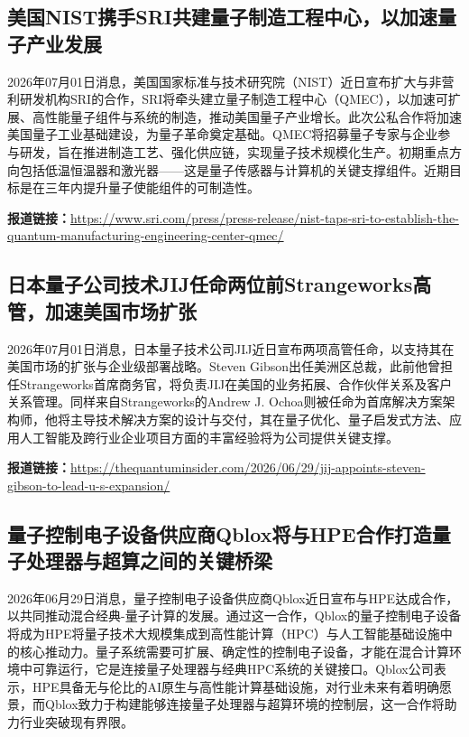\documentclass[12pt,a4paper]{ctexart}
\begin{document}
\subsection{ 美国NIST携手SRI共建量子制造工程中心，以加速量子产业发展 }

2026年07月01日消息，美国国家标准与技术研究院（NIST）近日宣布扩大与非营利研发机构SRI的合作，SRI将牵头建立量子制造工程中心（QMEC），以加速可扩展、高性能量子组件与系统的制造，推动美国量子产业增长。此次公私合作将加速美国量子工业基础建设，为量子革命奠定基础。QMEC将招募量子专家与企业参与研发，旨在推进制造工艺、强化供应链，实现量子技术规模化生产。初期重点方向包括低温恒温器和激光器——这是量子传感器与计算机的关键支撑组件。近期目标是在三年内提升量子使能组件的可制造性。

\noindent\textbf{报道链接：}\url{https://www.sri.com/press/press-release/nist-taps-sri-to-establish-the-quantum-manufacturing-engineering-center-qmec/}

\subsection{ 日本量子公司技术JIJ任命两位前Strangeworks高管，加速美国市场扩张 }

2026年07月01日消息，日本量子技术公司JIJ近日宣布两项高管任命，以支持其在美国市场的扩张与企业级部署战略。Steven Gibson出任美洲区总裁，此前他曾担任Strangeworks首席商务官，将负责JIJ在美国的业务拓展、合作伙伴关系及客户关系管理。同样来自Strangeworks的Andrew J. Ochoa则被任命为首席解决方案架构师，他将主导技术解决方案的设计与交付，其在量子优化、量子启发式方法、应用人工智能及跨行业企业项目方面的丰富经验将为公司提供关键支撑。

\noindent\textbf{报道链接：}\url{https://thequantuminsider.com/2026/06/29/jij-appoints-steven-gibson-to-lead-u-s-expansion/}

\subsection{ 量子控制电子设备供应商Qblox将与HPE合作打造量子处理器与超算之间的关键桥梁 }

2026年06月29日消息，量子控制电子设备供应商Qblox近日宣布与HPE达成合作，以共同推动混合经典-量子计算的发展。通过这一合作，Qblox的量子控制电子设备将成为HPE将量子技术大规模集成到高性能计算（HPC）与人工智能基础设施中的核心推动力。量子系统需要可扩展、确定性的控制电子设备，才能在混合计算环境中可靠运行，它是连接量子处理器与经典HPC系统的关键接口。Qblox公司表示，HPE具备无与伦比的AI原生与高性能计算基础设施，对行业未来有着明确愿景，而Qblox致力于构建能够连接量子处理器与超算环境的控制层，这一合作将助力行业突破现有界限。
\end{document}
